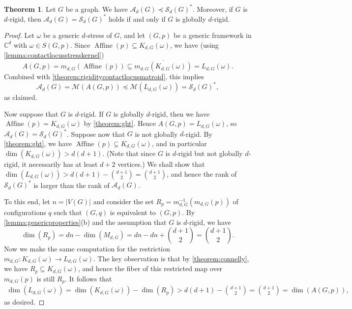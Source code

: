 \documentclass[11pt,a4paper,dvipsnames]{scrartcl}
\theoremstyle{definition}
\newtheorem{theorem}{Theorem}[section]
\newcommand{\CC}{\mathbb{C}}
\newcommand{\algmat}[1]{\mathcal{M}(#1)}
\newcommand{\stressmatroid}[2]{\mathcal{S}_{#1}(#2)}
\newcommand{\affinematroid}[2]{\mathcal{A}_{#1}(#2)}
\newcommand{\globrig}[1]{globally $#1$-rigid}
\newcommand{\rig}[1]{$#1$-rigid}
\newcommand{\stresskernel}[2]{K_{{#1},{#2}}}
\newcommand{\contactlocus}[2]{L_{#1,#2}}
\newcommand{\affineedge}[2]{A(#1,#2)}
\DeclareMathOperator{\aff}{Affine}
\newcommand{\affine}[2]{\aff(#2)}
\begin{document}
\begin{theorem}\label{theorem:affinematroidstressmatroid}
    Let $G$ be a graph. We have $\affinematroid{d}{G} \preceq \stressmatroid{d}{G}^*$. Moreover, if $G$ is \rig{d}, then $\affinematroid{d}{G} = \stressmatroid{d}{G}^*$ holds if and only if $G$ is \globrig{d}. 
\end{theorem}
\begin{proof}
    Let $\omega$ be a generic $d$-stress of $G$, and let $(G,p)$ be a generic framework in $\CC^d$ with $\omega \in S(G,p)$. Since $\affine{G}{p} \subseteq \stresskernel{d}{G}(\omega)$, we have (using \cref{lemma:contactlocusstresskernel}) \[\affineedge{G}{p} = m_{d,G}(\affine{G}{p}) \subseteq \overline{m_{d,G}(\stresskernel{d}{G}(\omega))} = \contactlocus{d}{G}(\omega).\]Combined with \cref{theorem:rigiditycontactlocusmatroid}, this implies \[\affinematroid{d}{G} = \algmat{\affineedge{G}{p}} \preceq \algmat{\contactlocus{d}{G}(\omega)} = \stressmatroid{d}{G}^*,\]
    as claimed.
    
    Now suppose that $G$ is \rig{d}. If $G$ is \globrig{d}, then we have $\affine{G}{p} = \stresskernel{d}{G}(\omega)$ by \cref{theorem:ght}. Hence $\affineedge{G}{p} = \contactlocus{d}{G}(\omega)$, so $\affinematroid{d}{G} = \stressmatroid{d}{G}^*$. Suppose now that $G$ is not \globrig{d}. By \cref{theorem:ght}, we have $\affine{G}{p} \subsetneq \stresskernel{d}{G}(\omega)$, and in particular $\dim(\stresskernel{d}{G}(\omega)) > d(d+1)$. (Note that since $G$ is \rig{d} but not \globrig{d}, it necessarily has at least $d+2$ vertices.) We shall show that $\dim(\contactlocus{d}{G}(\omega)) > d(d+1) - \binom{d+1}{2} = \binom{d+1}{2}$, and hence the rank of $\stressmatroid{d}{G}^*$ is larger than the rank of $\affinematroid{d}{G}$.
    
    To this end, let $n = |V(G)|$ and consider the set $R_p = m_{d,G}^{-1}(m_{d,G}(p))$ of configurations $q$ such that $(G,q)$ is equivalent to $(G,p)$. By \cref{lemma:genericproperties}(b) and the assumption that $G$ is \rig{d}, we have \[\dim(R_p) = dn - \dim(M_{d,G}) = dn - dn + \binom{d+1}{2} = \binom{d+1}{2}.\]
    Now we make the same computation for the restriction $m_{d,G} : \stresskernel{d}{G}(\omega) \rightarrow \contactlocus{d}{G}(\omega)$. The key observation is that by \cref{theorem:connelly}, we have $R_p \subseteq \stresskernel{d}{G}(\omega)$, and hence the fiber of this restricted map over $m_{d,G}(p)$ is still $R_p$. It follows that 
    \begin{align*}
        \dim(\contactlocus{d}{G}(\omega)) = \dim(\stresskernel{d}{G}(\omega)) - \dim(R_p) > d(d+1) - \binom{d+1}{2} = \binom{d+1}{2} = \dim(\affineedge{G}{p}),
    \end{align*}
    as desired.
    
\end{proof}
\end{document}
